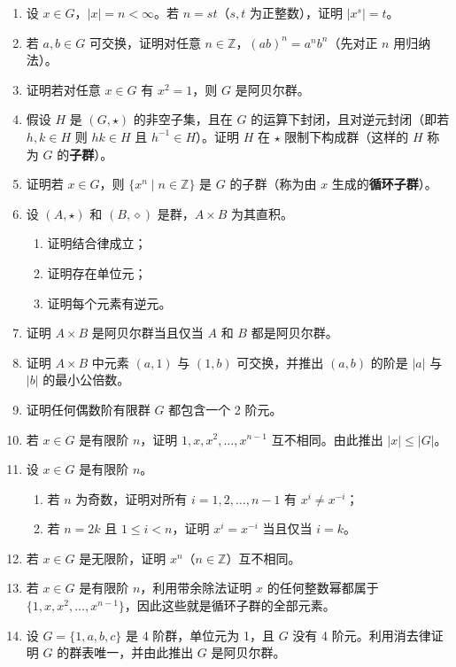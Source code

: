 \begin{enumerate}
\item 设 \(x \in G\)，\(|x| = n < \infty\)。若 \(n = st\)（\(s, t\) 为正整数），证明 \(|x^s| = t\)。
\item 若 \(a, b \in G\) 可交换，证明对任意 \(n \in \mathbb{Z}\)，\((ab)^n = a^n b^n\)（先对正 \(n\) 用归纳法）。
\item 证明若对任意 \(x \in G\) 有 \(x^2 = 1\)，则 \(G\) 是阿贝尔群。
\item 假设 \(H\) 是 \((G, \star)\) 的非空子集，且在 \(G\) 的运算下封闭，且对逆元封闭（即若 \(h, k \in H\) 则 \(hk \in H\) 且 \(h^{-1} \in H\)）。证明 \(H\) 在 \(\star\) 限制下构成群（这样的 \(H\) 称为 \(G\) 的\textbf{子群}）。
\item 证明若 \(x \in G\)，则 \(\{x^n \mid n \in \mathbb{Z}\}\) 是 \(G\) 的子群（称为由 \(x\) 生成的\textbf{循环子群}）。
\item 设 \((A, \star)\) 和 \((B, \diamond)\) 是群，\(A \times B\) 为其直积。
\begin{enumerate}
\item 证明结合律成立；
\item 证明存在单位元；
\item 证明每个元素有逆元。
\end{enumerate}
\item 证明 \(A \times B\) 是阿贝尔群当且仅当 \(A\) 和 \(B\) 都是阿贝尔群。
\item 证明 \(A \times B\) 中元素 \((a, 1)\) 与 \((1, b)\) 可交换，并推出 \((a, b)\) 的阶是 \(|a|\) 与 \(|b|\) 的最小公倍数。
\item 证明任何偶数阶有限群 \(G\) 都包含一个 2 阶元。
\item 若 \(x \in G\) 是有限阶 \(n\)，证明 \(1, x, x^2, \ldots, x^{n-1}\) 互不相同。由此推出 \(|x| \le |G|\)。
\item 设 \(x \in G\) 是有限阶 \(n\)。
\begin{enumerate}
\item 若 \(n\) 为奇数，证明对所有 \(i = 1, 2, \ldots, n-1\) 有 \(x^i \neq x^{-i}\)；
\item 若 \(n = 2k\) 且 \(1 \le i < n\)，证明 \(x^i = x^{-i}\) 当且仅当 \(i = k\)。
\end{enumerate}
\item 若 \(x \in G\) 是无限阶，证明 \(x^n\)（\(n \in \mathbb{Z}\)）互不相同。
\item 若 \(x \in G\) 是有限阶 \(n\)，利用带余除法证明 \(x\) 的任何整数幂都属于 \(\{1, x, x^2, \ldots, x^{n-1}\}\)，因此这些就是循环子群的全部元素。
\item 设 \(G = \{1, a, b, c\}\) 是 4 阶群，单位元为 1，且 \(G\) 没有 4 阶元。利用消去律证明 \(G\) 的群表唯一，并由此推出 \(G\) 是阿贝尔群。
\end{enumerate}

